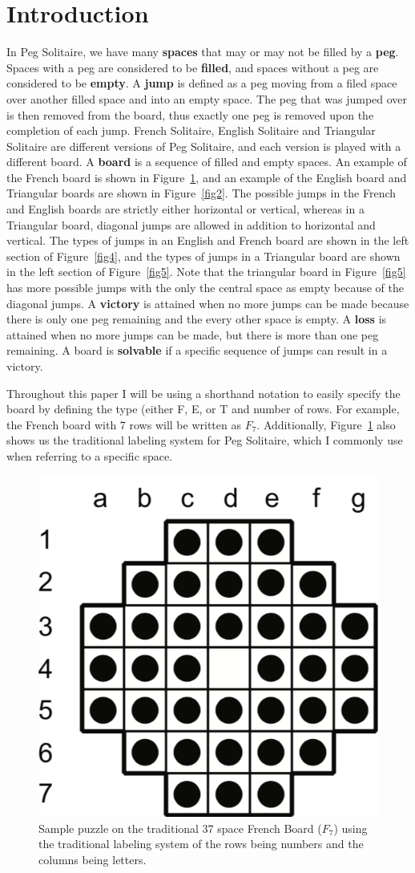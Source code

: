 \documentclass{article}
\begin{document}
\section{Introduction}
In Peg Solitaire, we have many \textbf{spaces} that may or may not be filled by a \textbf{peg}. Spaces with a peg are considered to be \textbf{filled}, and spaces without a peg are considered to be \textbf{empty}. A \textbf{jump} is defined as a peg moving from a filed space over another filled space and into an empty space. The peg that was jumped over is then removed from the board, thus exactly one peg is removed upon the completion of each jump. French Solitaire, English Solitaire and Triangular Solitaire are different versions of Peg Solitaire, and each version is played with a different board. A \textbf{board} is a sequence of filled and empty spaces. An example of the French board is shown in Figure~\ref{fig1}, and an example of the English board and Triangular boards are shown in Figure~\ref{fig2}. The possible jumps in the French and English boards are strictly either horizontal or vertical, whereas in a Triangular board, diagonal jumps are allowed in addition to horizontal and vertical. The types of jumps in an English and French board are shown in the left section of Figure~\ref{fig4}, and the types of jumps in a Triangular board are shown in the left section of Figure~\ref{fig5}. Note that the triangular board in Figure~\ref{fig5} has more possible jumps with the only the central space as empty because of the diagonal jumps. A \textbf{victory} is attained when no more jumps can be made because there is only one peg remaining and the every other space is empty. A \textbf{loss} is attained when no more jumps can be made, but there is more than one peg remaining. A board is \textbf{solvable} if a specific sequence of jumps can result in a victory.

Throughout this paper I will be using a shorthand notation to easily specify the board by defining the type (either F, E, or T and number of rows. For example, the French board with 7 rows will be written as $F_7$. Additionally, Figure~\ref{fig1} also shows us the traditional labeling system for Peg Solitaire, which I commonly use when referring to a specific space.

\begin{figure}[htb]
\centering
\includegraphics[width  = 5 cm]{Figures/Figure1}
\caption{Sample puzzle on the traditional 37 space French Board ($F_7$) using the traditional labeling system of the rows being numbers and the columns being letters.}
\label{fig1}
\end{figure}
\end{document}
